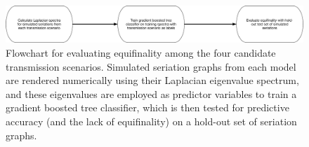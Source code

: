     
    
    \begin{figure}[p!]
    \centering
    \includegraphics[scale=0.35,angle=90]{graphics/multipleseriation/theoretical-classification-equifinality-workflow.pdf}
    \caption{Flowchart for evaluating equifinality among the four candidate transmission scenarios.  Simulated seriation graphs from each model are rendered numerically using their Laplacian eigenvalue spectrum, and these eigenvalues are employed as predictor variables to train a gradient boosted tree classifier, which is then tested for predictive accuracy (and the lack of equifinality) on a hold-out set of seriation graphs.}
    \label{metapop:fig:equifinality-assessement-flowchart}
    \end{figure}
    
